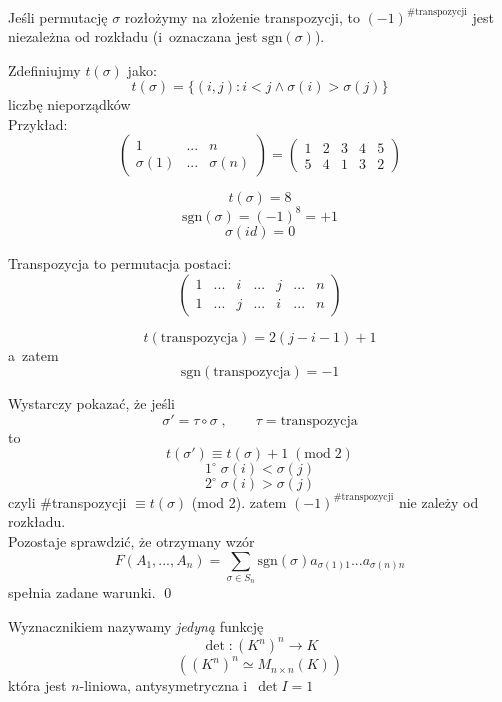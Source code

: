 \begin{lem}
    Jeśli permutację $\sigma$ rozłożymy na złożenie transpozycji, to $(-1)^{\#\mathrm{transpozycji}}$ jest niezależna od rozkładu (i~oznaczana jest $\mathrm{sgn}(\sigma)$).
\end{lem}

\begin{dd}
    Zdefiniujmy $t(\sigma)$ jako:
  \[t(\sigma)=\{(i,j): i<j \land \sigma(i)>\sigma(j)\}\]
  liczbę nieporządków\\
  Przykład:
  \[\begin{pmatrix}1&...&n\\\sigma(1)&...&\sigma(n)\end{pmatrix}
    =\begin{pmatrix}1&2&3&4&5\\5&4&1&3&2\end{pmatrix}\]

  \[t(\sigma) = 8\]
  \[\mathrm{sgn}(\sigma) = (-1)^8 = +1\]
  \[\sigma(id) = 0\]

  Transpozycja to permutacja postaci:
  \[\begin{pmatrix}
    1&...&i&...&j&...&n\\
    1&...&j&...&i&...&n
  \end{pmatrix}\]

  \[t(\mathrm{transpozycja})=2(j-i-1)+1\]
  a~zatem
  \[\mathrm{sgn}(\mathrm{transpozycja})=-1\]

  Wystarczy pokazać, że jeśli
  \[\sigma' = \tau \circ \sigma\;,\qquad \tau=\mathrm{transpozycja}\]
  to
  \[t(\sigma') \equiv t(\sigma)+1 \;(\mathrm{mod}\; 2)\]
  \[1^\circ\; \sigma(i) < \sigma(j)\]
  \[2^\circ\; \sigma(i) > \sigma(j)\]
  czyli \#transpozycji $\equiv t(\sigma)$ (mod 2).
  zatem $(-1)^{\#\mathrm{transpozycji}}$ nie zależy od rozkładu.\\
  Pozostaje sprawdzić, że otrzymany wzór
  \[F(A_1, ..., A_n)=\sum_{\sigma \in S_n}\mathrm{sgn}(\sigma)a_{\sigma(1)1}...a_{\sigma(n)n}\]
  spełnia zadane warunki. \qed
\end{dd}

\begin{df}
    Wyznacznikiem nazywamy \textit{jedyną} funkcję
  \[\det: (K^n)^n \rightarrow K\]
  \[\left((K^n)^n \simeq M_{n \times n}(K)\right)\]
  która jest $n$-liniowa, antysymetryczna i~$\det I=1$
\end{df}

